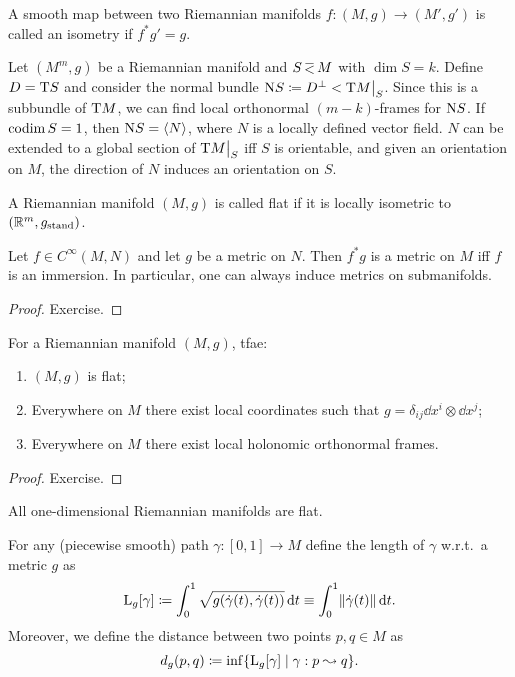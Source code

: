 \begin{defn}[Isometry]
    A smooth map between two Riemannian manifolds $f:(M,g)\to(M',g')$ is called an isometry if $f^\ast g'=g$.
\end{defn}

\begin{cor}
    Let $(M^m,g)$ be a Riemannian manifold and $S\emb M$ with $\dim S=k$. Define $D=\mathrm{T} S$ and consider the normal bundle $\rmN S\coloneqq D^\perp<\restr{\T M}{S}$. Since this is a subbundle of $\mathrm{T} M$, we can find local orthonormal $(m-k)$-frames for $\mathrm{N} S$. If $\operatorname{codim} S=1$, then $\mathrm{N} S=\left\langle N\right\rangle$, where $N$ is a locally defined vector field. $N$ can be extended to a global section of $\restr{\T M}{S}$ iff $S$ is orientable, and given an orientation on $M$, the direction of $N$ induces an orientation on $S$.
\end{cor}


\begin{defn}
    A Riemannian manifold $(M,g)$ is called flat if it is locally isometric to $(\mathbb{R}^m,g_{\text{stand}})$.
\end{defn}


\begin{thm}
    Let $f\in C^\infty(M,N)$ and let $g$ be a metric on $N$. Then $f^\ast g$ is a metric on $M$ iff $f$ is an immersion. In particular, one can always induce metrics on submanifolds.
\end{thm}
\begin{proof}
    Exercise.
\end{proof}

\begin{thm}
For a Riemannian manifold $(M,g)$,  \gls{tfae}:
\begin{enumerate}
    \item $(M,g)$ is flat;
    \item Everywhere on $M$ there exist local coordinates such that $g=\delta_{ij} \dd x^i\otimes \dd x^j$;
    \item Everywhere on $M$ there exist local holonomic orthonormal frames.
\end{enumerate}
\end{thm}
\begin{proof}
    Exercise.
\end{proof}
\begin{cor}
    All one-dimensional Riemannian manifolds are flat.
\end{cor}


\begin{defn}
    For any (piecewise smooth) path $\gamma:[0,1]\to M$ define the length of $\gamma$ w.r.t.\ a metric $g$ as
    \[\mathrm{L}_g[\gamma]\coloneqq \int_0^1 \sqrt{g(\dot\gamma(t),\dot\gamma(t))}\mathop{}\!\mathrm{d} t \equiv \int_0^1 \lVert\dot\gamma(t)\rVert \mathop{}\!\mathrm{d} t.\]
    Moreover, we define the distance between two points $p,q\in M$ as 
    \[d_g(p,q)\coloneqq \inf \{\mathrm{L}_g[\gamma]\mid \gamma:p\leadsto q\}.\]
\end{defn}

